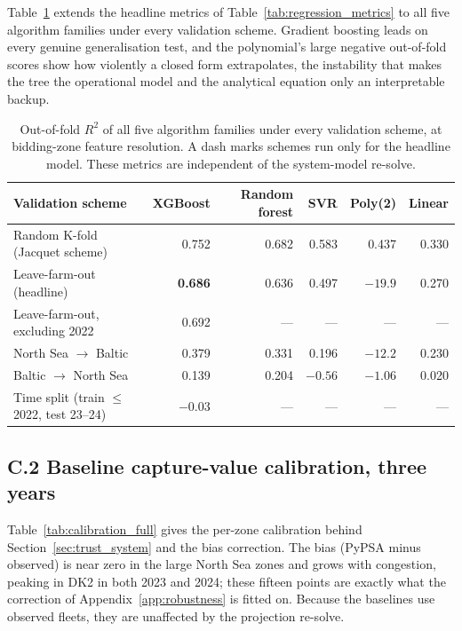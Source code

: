 Table~\ref{tab:regression_full} extends the headline metrics of
Table~\ref{tab:regression_metrics} to all five algorithm families under every
validation scheme. Gradient boosting leads on every genuine generalisation
test, and the polynomial's large negative out-of-fold scores show how violently a
closed form extrapolates, the instability that makes the tree the operational
model and the analytical equation only an interpretable backup.

\begin{table}[!htb]
\centering\small
\caption{Out-of-fold $R^2$ of all five algorithm families under every validation
scheme, at bidding-zone feature resolution. A dash marks schemes run only for
the headline model. These metrics are independent of the system-model re-solve.}
\label{tab:regression_full}
\begin{tabular}{l r r r r r}
\toprule
\textbf{Validation scheme} & \textbf{XGBoost} & \textbf{Random forest} & \textbf{SVR} &
\textbf{Poly(2)} & \textbf{Linear} \\
\midrule
Random K-fold (Jacquet scheme)    & 0.752 & 0.682 & 0.583 & 0.437 & 0.330 \\
Leave-farm-out (headline)           & \textbf{0.686} & 0.636 & 0.497 & $-19.9$ & 0.270 \\
Leave-farm-out, excluding 2022      & 0.692 & --- & --- & --- & --- \\
North Sea $\rightarrow$ Baltic      & 0.379 & 0.331 & 0.196 & $-12.2$ & 0.230 \\
Baltic $\rightarrow$ North Sea      & 0.139 & 0.204 & $-0.56$ & $-1.06$ & 0.020 \\
Time split (train $\le$2022, test 23--24) & $-0.03$ & --- & --- & --- & --- \\
\bottomrule
\end{tabular}
\end{table}

\subsection*{C.2 Baseline capture-value calibration, three years}

Table~\ref{tab:calibration_full} gives the per-zone calibration behind
Section~\ref{sec:trust_system} and the bias correction. The bias (PyPSA minus
observed) is near zero in the large North Sea zones and grows with congestion,
peaking in DK2 in both 2023 and 2024; these fifteen points are exactly what the
correction of Appendix~\ref{app:robustness} is fitted on. Because the baselines use
observed fleets, they are unaffected by the projection re-solve.

